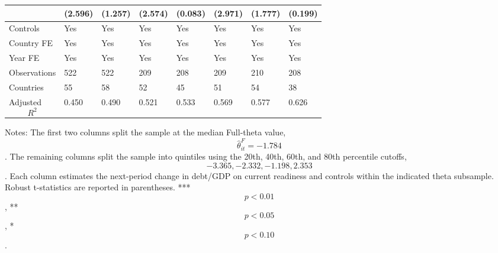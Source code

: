 \begin{table}[H]
\begin{threeparttable}
\begin{tabularx}{\textwidth}{lYYYYYYY}
  & (2.596) & (1.257) & (2.574) & (0.083) & (2.971) & (1.777) & (0.199) \\
\midrule
Controls & Yes & Yes & Yes & Yes & Yes & Yes & Yes \\
Country FE & Yes & Yes & Yes & Yes & Yes & Yes & Yes \\
Year FE & Yes & Yes & Yes & Yes & Yes & Yes & Yes \\
Observations & 522 & 522 & 209 & 208 & 209 & 210 & 208 \\
Countries & 55 & 58 & 52 & 45 & 51 & 54 & 38 \\
Adjusted $$R^2$$ & 0.450 & 0.490 & 0.521 & 0.533 & 0.569 & 0.577 & 0.626 \\
\bottomrule
\end{tabularx}
\begin{tablenotes}[flushleft]\footnotesize
\item Notes: The first two columns split the sample at the median Full-theta value, $$\widehat{\theta}^{F}_{it}=-1.784$$. The remaining columns split the sample into quintiles using the 20th, 40th, 60th, and 80th percentile cutoffs, $$-3.365, -2.332, -1.198, 2.353$$. Each column estimates the next-period change in debt/GDP on current readiness and controls within the indicated theta subsample. Robust t-statistics are reported in parentheses. *** $$p<0.01$$, ** $$p<0.05$$, * $$p<0.10$$.
\end{tablenotes}
\end{threeparttable}
\end{table}

